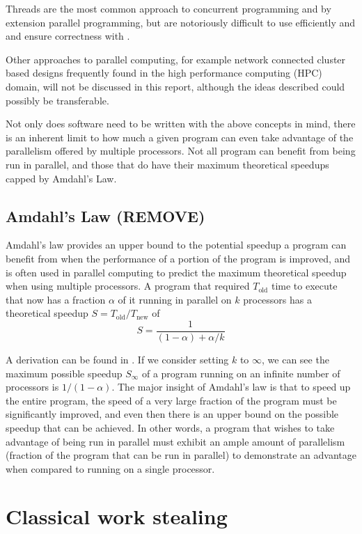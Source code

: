 \documentclass[bsc,frontabs,singlespacing,parskip,deptreport,normalheadings]{infthesis}
\begin{document}
Threads are the most common approach to concurrent programming and by extension
parallel programming, but are notoriously difficult to use efficiently and
and ensure correctness with \cite{lee_problem_2006}.

Other approaches to parallel computing, for example network connected cluster
based designs frequently found in the high performance computing (HPC) domain,
will not be discussed in this report, although the ideas described could
possibly be transferable.

Not only does software need to be written with the above concepts in mind, there
is an inherent limit to how much a given program can even take advantage of the
parallelism offered by multiple processors. Not all program can benefit from
being run in parallel, and those that do have their maximum theoretical speedups
capped by Amdahl's Law.

\subsection{Amdahl's Law (REMOVE)}

Amdahl's law provides an upper bound to the potential speedup a program can
benefit from when the performance of a portion of the program is improved, and
is often used in parallel computing to predict the maximum theoretical speedup
when using multiple processors. A program that required \(T_\text{old}\) time to
execute that now has a fraction \(\alpha\) of it running in parallel on \(k\)
processors has a theoretical speedup \(S = T_\text{old} / T_\text{new}\) of \[ S
= \frac{1}{(1 - \alpha) + \alpha / k} \]

A derivation can be found in \cite{bryant_computer_2016}. If we consider setting
\(k\) to \(\infty\), we can see the maximum possible speedup \(S_\infty\) of a
program running on an infinite number of processors is \(1 / (1 - \alpha)\). The
major insight of Amdahl's law is that to speed up the entire program, the speed
of a very large fraction of the program must be significantly improved, and even
then there is an upper bound on the possible speedup that can be achieved. In
other words, a program that wishes to take advantage of being run in parallel
must exhibit an ample amount of parallelism (fraction of the program that can be
run in parallel) to demonstrate an advantage when compared to running on a
single processor.

\section{Classical work stealing}
\end{document}
